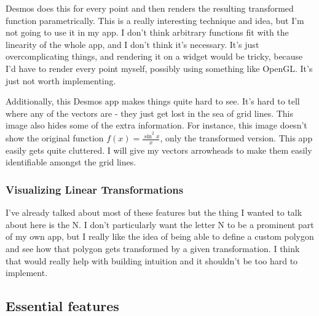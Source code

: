 \documentclass[../main.tex]{subfiles}
\begin{document}
Desmos does this for every point and then renders the resulting transformed function parametrically. This is a really interesting technique and idea, but I'm not going to use it in my app. I don't think arbitrary functions fit with the linearity of the whole app, and I don't think it's necessary. It's just overcomplicating things, and rendering it on a widget would be tricky, because I'd have to render every point myself, possibly using something like OpenGL. It's just not worth implementing.

Additionally, this Desmos app makes things quite hard to see. It's hard to tell where any of the vectors are - they just get lost in the sea of grid lines. This image also hides some of the extra information. For instance, this image doesn't show the original function $f(x) = \frac{\sin^2 x}{x}$, only the transformed version. This app easily gets quite cluttered. I will give my vectors arrowheads to make them easily identifiable amongst the grid lines.

\subsubsection{Visualizing Linear Transformations\label{analysis:research-on-existing-solutions:geogebra-applet}}


I've already talked about most of these features but the thing I wanted to talk about here is the N. I don't particularly want the letter N to be a prominent part of my own app, but I really like the idea of being able to define a custom polygon and see how that polygon gets transformed by a given transformation. I think that would really help with building intuition and it shouldn't be too hard to implement.

\subsection{Essential features\label{analysis:essential-features}}
\end{document}
